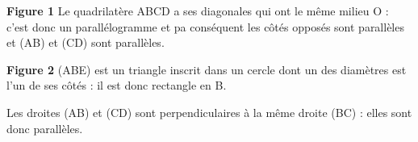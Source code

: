 
\medskip


%
%
% 
%
%
%
%
% 
%
\textbf{Figure 1} Le quadrilatère ABCD a ses diagonales qui ont le même milieu O : c’est donc un parallélogramme et pa conséquent les côtés opposés sont parallèles et (AB) et (CD) sont parallèles.

\textbf{Figure 2} (ABE) est un triangle inscrit dans un cercle dont un des diamètres est l’un de ses côtés : il est donc rectangle en B.

Les droites (AB) et (CD) sont perpendiculaires à la même droite (BC) : elles sont donc parallèles. 
\bigskip

